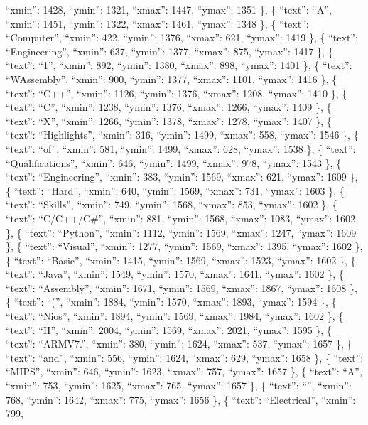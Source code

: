 \documentclass[
]{article}
\begin{document}
``xmin'': 1428, ``ymin'': 1321, ``xmax'': 1447, ``ymax'': 1351 \}, \{
``text'': ``A'', ``xmin'': 1451, ``ymin'': 1322, ``xmax'': 1461,
``ymax'': 1348 \}, \{ ``text'': ``Computer'', ``xmin'': 422, ``ymin'':
1376, ``xmax'': 621, ``ymax'': 1419 \}, \{ ``text'': ``Engineering'',
``xmin'': 637, ``ymin'': 1377, ``xmax'': 875, ``ymax'': 1417 \}, \{
``text'': ``1'', ``xmin'': 892, ``ymin'': 1380, ``xmax'': 898, ``ymax'':
1401 \}, \{ ``text'': ``WAssembly'', ``xmin'': 900, ``ymin'': 1377,
``xmax'': 1101, ``ymax'': 1416 \}, \{ ``text'': ``C++'', ``xmin'': 1126,
``ymin'': 1376, ``xmax'': 1208, ``ymax'': 1410 \}, \{ ``text'': ``C'',
``xmin'': 1238, ``ymin'': 1376, ``xmax'': 1266, ``ymax'': 1409 \}, \{
``text'': ``X'', ``xmin'': 1266, ``ymin'': 1378, ``xmax'': 1278,
``ymax'': 1407 \}, \{ ``text'': ``Highlights'', ``xmin'': 316, ``ymin'':
1499, ``xmax'': 558, ``ymax'': 1546 \}, \{ ``text'': ``of'', ``xmin'':
581, ``ymin'': 1499, ``xmax'': 628, ``ymax'': 1538 \}, \{ ``text'':
``Qualifications'', ``xmin'': 646, ``ymin'': 1499, ``xmax'': 978,
``ymax'': 1543 \}, \{ ``text'': ``Engineering'', ``xmin'': 383,
``ymin'': 1569, ``xmax'': 621, ``ymax'': 1609 \}, \{ ``text'': ``Hard'',
``xmin'': 640, ``ymin'': 1569, ``xmax'': 731, ``ymax'': 1603 \}, \{
``text'': ``Skills'', ``xmin'': 749, ``ymin'': 1568, ``xmax'': 853,
``ymax'': 1602 \}, \{ ``text'': ``C/C++/C\#'', ``xmin'': 881, ``ymin'':
1568, ``xmax'': 1083, ``ymax'': 1602 \}, \{ ``text'': ``Python'',
``xmin'': 1112, ``ymin'': 1569, ``xmax'': 1247, ``ymax'': 1609 \}, \{
``text'': ``Visual'', ``xmin'': 1277, ``ymin'': 1569, ``xmax'': 1395,
``ymax'': 1602 \}, \{ ``text'': ``Basic'', ``xmin'': 1415, ``ymin'':
1569, ``xmax'': 1523, ``ymax'': 1602 \}, \{ ``text'': ``Java'',
``xmin'': 1549, ``ymin'': 1570, ``xmax'': 1641, ``ymax'': 1602 \}, \{
``text'': ``Assembly'', ``xmin'': 1671, ``ymin'': 1569, ``xmax'': 1867,
``ymax'': 1608 \}, \{ ``text'': ``('', ``xmin'': 1884, ``ymin'': 1570,
``xmax'': 1893, ``ymax'': 1594 \}, \{ ``text'': ``Nios'', ``xmin'':
1894, ``ymin'': 1569, ``xmax'': 1984, ``ymax'': 1602 \}, \{ ``text'':
``II'', ``xmin'': 2004, ``ymin'': 1569, ``xmax'': 2021, ``ymax'': 1595
\}, \{ ``text'': ``ARMV7.'', ``xmin'': 380, ``ymin'': 1624, ``xmax'':
537, ``ymax'': 1657 \}, \{ ``text'': ``and'', ``xmin'': 556, ``ymin'':
1624, ``xmax'': 629, ``ymax'': 1658 \}, \{ ``text'': ``MIPS'', ``xmin'':
646, ``ymin'': 1623, ``xmax'': 757, ``ymax'': 1657 \}, \{ ``text'':
``A'', ``xmin'': 753, ``ymin'': 1625, ``xmax'': 765, ``ymax'': 1657 \},
\{ ``text'': ``\textbar{}'', ``xmin'': 768, ``ymin'': 1642, ``xmax'':
775, ``ymax'': 1656 \}, \{ ``text'': ``Electrical'', ``xmin'': 799,
\end{document}
